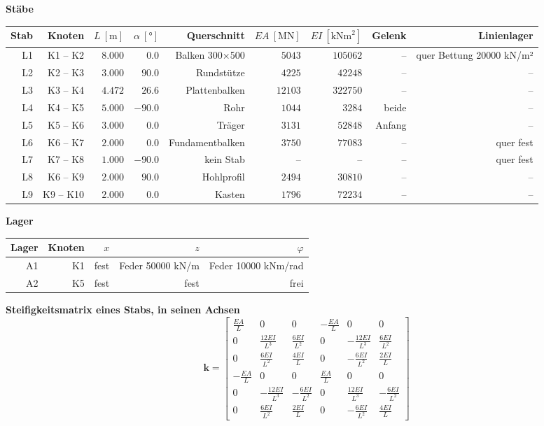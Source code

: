 \documentclass[11pt,a4paper]{article}
\begin{document}
\noindent\textbf{Stäbe}
\begin{longtable}{rrrrrrrrr}
\hline
Stab & Knoten & $L\ [\mathrm{m}]$ & $\alpha\ [°]$ & Querschnitt & $EA\ [\mathrm{MN}]$ & $EI\ [\mathrm{kNm}^{2}]$ & Gelenk & Linienlager \\
\hline
\endhead
L1 & K1 – K2 & $8.000$ & $0.0$ & Balken 300×500 & $5043$ & $105062$ & – & quer Bettung 20000 kN/m² \\
L2 & K2 – K3 & $3.000$ & $90.0$ & Rundstütze & $4225$ & $42248$ & – & – \\
L3 & K3 – K4 & $4.472$ & $26.6$ & Plattenbalken & $12103$ & $322750$ & – & – \\
L4 & K4 – K5 & $5.000$ & $-90.0$ & Rohr & $1044$ & $3284$ & beide & – \\
L5 & K5 – K6 & $3.000$ & $0.0$ & Träger & $3131$ & $52848$ & Anfang & – \\
L6 & K6 – K7 & $2.000$ & $0.0$ & Fundamentbalken & $3750$ & $77083$ & – & quer fest \\
L7 & K7 – K8 & $1.000$ & $-90.0$ & kein Stab & – & – & – & quer fest \\
L8 & K6 – K9 & $2.000$ & $90.0$ & Hohlprofil & $2494$ & $30810$ & – & – \\
L9 & K9 – K10 & $2.000$ & $0.0$ & Kasten & $1796$ & $72234$ & – & – \\
\hline
\end{longtable}
\noindent\textbf{Lager}
\begin{longtable}{rrrrr}
\hline
Lager & Knoten & $x$ & $z$ & $\varphi$ \\
\hline
\endhead
A1 & K1 & fest & Feder 50000 kN/m & Feder 10000 kNm/rad \\
A2 & K5 & fest & fest & frei \\
\hline
\end{longtable}
\noindent\textbf{Steifigkeitsmatrix eines Stabs, in seinen Achsen}
\begin{equation*}
\mathbf{k} = \begin{bmatrix} \frac{EA}{L} & 0 & 0 & -\frac{EA}{L} & 0 & 0 \\ 0 & \frac{12EI}{L^3} & \frac{6EI}{L^2} & 0 & -\frac{12EI}{L^3} & \frac{6EI}{L^2} \\ 0 & \frac{6EI}{L^2} & \frac{4EI}{L} & 0 & -\frac{6EI}{L^2} & \frac{2EI}{L} \\ -\frac{EA}{L} & 0 & 0 & \frac{EA}{L} & 0 & 0 \\ 0 & -\frac{12EI}{L^3} & -\frac{6EI}{L^2} & 0 & \frac{12EI}{L^3} & -\frac{6EI}{L^2} \\ 0 & \frac{6EI}{L^2} & \frac{2EI}{L} & 0 & -\frac{6EI}{L^2} & \frac{4EI}{L} \end{bmatrix}
\end{equation*}
\end{document}
